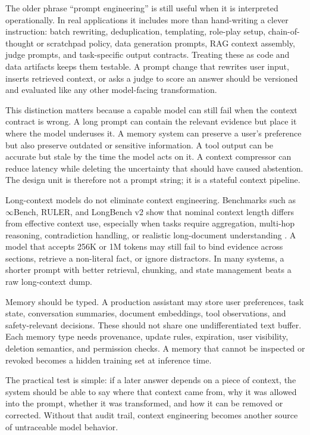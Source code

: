 The older phrase ``prompt engineering'' is still useful when it is interpreted operationally. In real applications it includes more than hand-writing a clever instruction: batch rewriting, deduplication, templating, role-play setup, chain-of-thought or scratchpad policy, data generation prompts, RAG context assembly, judge prompts, and task-specific output contracts. Treating these as code and data artifacts keeps them testable. A prompt change that rewrites user input, inserts retrieved context, or asks a judge to score an answer should be versioned and evaluated like any other model-facing transformation.

This distinction matters because a capable model can still fail when the context contract is wrong. A long prompt can contain the relevant evidence but place it where the model underuses it. A memory system can preserve a user's preference but also preserve outdated or sensitive information. A tool output can be accurate but stale by the time the model acts on it. A context compressor can reduce latency while deleting the uncertainty that should have caused abstention. The design unit is therefore not a prompt string; it is a stateful context pipeline.

Long-context models do not eliminate context engineering. Benchmarks such as $\infty$Bench, RULER, and LongBench v2 show that nominal context length differs from effective context use, especially when tasks require aggregation, multi-hop reasoning, contradiction handling, or realistic long-document understanding \cite{zhang2024inftybench,hsieh2024ruler,bai2024longbenchv2}. A model that accepts 256K or 1M tokens may still fail to bind evidence across sections, retrieve a non-literal fact, or ignore distractors. In many systems, a shorter prompt with better retrieval, chunking, and state management beats a raw long-context dump.

Memory should be typed. A production assistant may store user preferences, task state, conversation summaries, document embeddings, tool observations, and safety-relevant decisions. These should not share one undifferentiated text buffer. Each memory type needs provenance, update rules, expiration, user visibility, deletion semantics, and permission checks. A memory that cannot be inspected or revoked becomes a hidden training set at inference time.

The practical test is simple: if a later answer depends on a piece of context, the system should be able to say where that context came from, why it was allowed into the prompt, whether it was transformed, and how it can be removed or corrected. Without that audit trail, context engineering becomes another source of untraceable model behavior.


